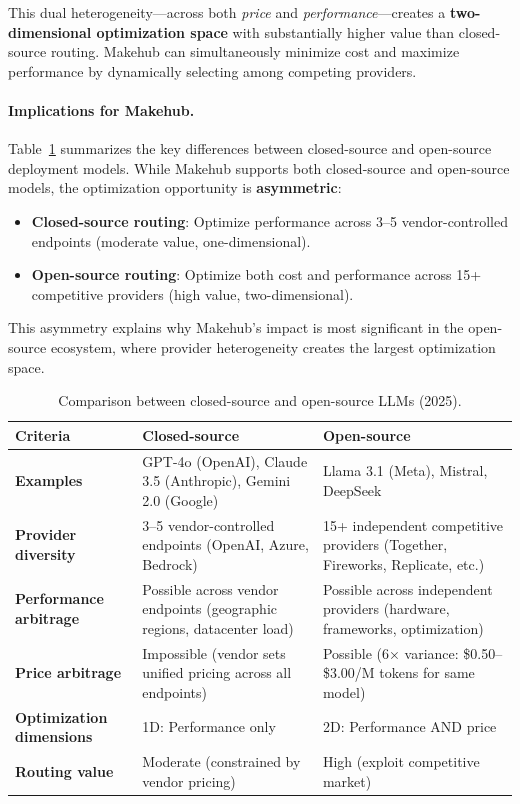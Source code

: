 \documentclass[english]{article}
\begin{document}
This dual heterogeneity—across both \emph{price} and \emph{performance}—creates a \textbf{two-dimensional optimization space} with substantially higher value than closed-source routing. Makehub can simultaneously minimize cost and maximize performance by dynamically selecting among competing providers.

\paragraph{Implications for Makehub.}

Table~\ref{tab:llm_comparison} summarizes the key differences between closed-source and open-source deployment models. While Makehub supports both closed-source and open-source models, the optimization opportunity is \textbf{asymmetric}:

\begin{itemize}
    \item \textbf{Closed-source routing}: Optimize performance across 3--5 vendor-controlled endpoints (moderate value, one-dimensional).
    \item \textbf{Open-source routing}: Optimize both cost and performance across 15+ competitive providers (high value, two-dimensional).
\end{itemize}

This asymmetry explains why Makehub's impact is most significant in the open-source ecosystem, where provider heterogeneity creates the largest optimization space.

\begin{table}[H]
\centering
\caption{Comparison between closed-source and open-source LLMs (2025).}
\label{tab:llm_comparison}
\begin{tabular}{|p{3cm}|p{5.5cm}|p{5.5cm}|}
\hline
\textbf{Criteria} & \textbf{Closed-source} & \textbf{Open-source} \\
\hline
\textbf{Examples} & GPT-4o (OpenAI), Claude 3.5 (Anthropic), Gemini 2.0 (Google) & Llama 3.1 (Meta), Mistral, DeepSeek \\
\hline
\textbf{Provider diversity} & 3--5 vendor-controlled endpoints (OpenAI, Azure, Bedrock) & 15+ independent competitive providers (Together, Fireworks, Replicate, etc.) \\
\hline
\textbf{Performance arbitrage} & Possible across vendor endpoints (geographic regions, datacenter load) & Possible across independent providers (hardware, frameworks, optimization) \\
\hline
\textbf{Price arbitrage} & Impossible (vendor sets unified pricing across all endpoints) & Possible (6× variance: \$0.50--\$3.00/M tokens for same model) \\
\hline
\textbf{Optimization dimensions} & 1D: Performance only & 2D: Performance AND price \\
\hline
\textbf{Routing value} & Moderate (constrained by vendor pricing) & High (exploit competitive market) \\
\hline
\end{tabular}
\end{table}
\end{document}
